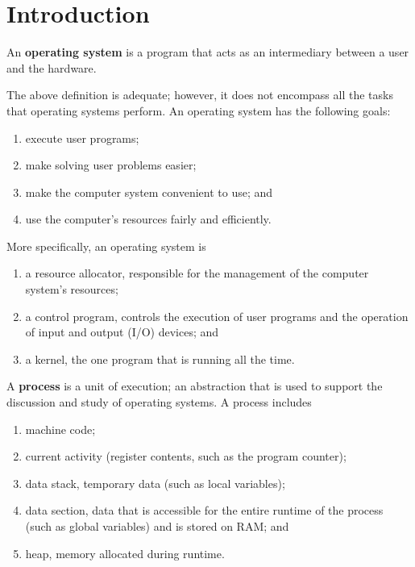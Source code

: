 \chapter{Introduction}

\begin{definition} 
    An \textbf{operating system} is a program that acts as an intermediary between a user and the hardware.
\end{definition}

The above definition is adequate; however, it does not encompass all the tasks that operating systems perform. An operating system has the following goals:

\begin{enumerate}
    \item execute user programs;
    
    \item make solving user problems easier;
    
    \item make the computer system convenient to use; and
    
    \item use the computer's resources fairly and efficiently.
\end{enumerate}

More specifically, an operating system is

\begin{enumerate}
    \item a resource allocator, responsible for the management of the computer system's resources;
    
    \item a control program, controls the execution of user programs and the operation of input and output (I/O) devices; and
    
    \item a kernel, the one program that is running all the time.
\end{enumerate}

\begin{definition}[Process]
    A \textbf{process} is a unit of execution; an abstraction that is used to support the discussion and study of operating systems. A process includes
    
    \begin{enumerate}
        \item machine code;
        
        \item current activity (register contents, such as the program counter);
        
        \item data stack, temporary data (such as local variables);
        
        \item data section, data that is accessible for the entire runtime of the process (such as global variables) and is stored on RAM; and
        
        \item heap, memory allocated during runtime.
    \end{enumerate}
\end{definition}

